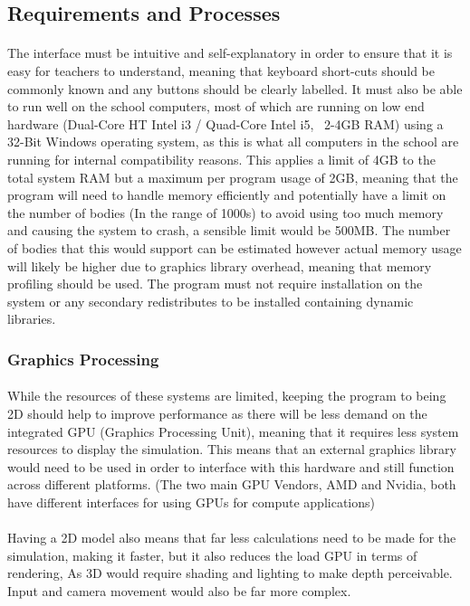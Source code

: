 \subsection{Requirements and Processes}
\paragraph{}
The interface must be intuitive and self-explanatory in order to ensure that it is easy for teachers to understand, meaning that keyboard short-cuts should be commonly known and any buttons should be clearly labelled. It must also be able to run well on the school computers, most of which are running on low end hardware (Dual-Core HT Intel i3 / Quad-Core Intel i5, ~2-4GB RAM) using a 32-Bit Windows operating system, as this is what all computers in the school are running for internal compatibility reasons. This applies a limit of 4GB to the total system RAM but a maximum per program usage of 2GB, meaning that the program will need to handle memory efficiently and potentially have a limit on the number of bodies (In the range of 1000s) to avoid using too much memory and causing the system to crash, a sensible limit would be 500MB. The number of bodies that this would support can be estimated however actual memory usage will likely be higher due to graphics library overhead, meaning that memory profiling should be used. The program must not require installation on the system or any secondary redistributes to be installed containing dynamic libraries.

\subsubsection{Graphics Processing}

\paragraph{}
While the resources of these systems are limited, keeping the program to being 2D should help to improve performance as there will be less demand on the integrated GPU (Graphics Processing Unit), meaning that it requires less system resources to display the simulation. This means that an external graphics library would need to be used in order to interface with this hardware and still function across different platforms. (The two main GPU Vendors, AMD and Nvidia, both have different interfaces for using GPUs for compute applications) 

\paragraph{}Having a 2D model also means that far less calculations need to be made for the simulation, making it faster, but it also reduces the load GPU in terms of rendering, As 3D would require shading and lighting to make depth perceivable. Input and camera movement would also be far more complex.

